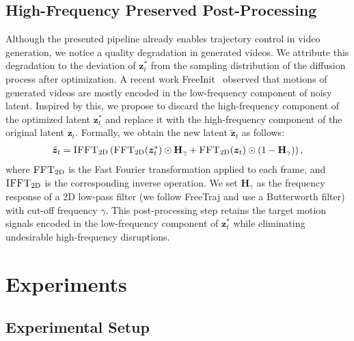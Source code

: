 \documentclass{article} \usepackage{iclr2025_conference,times}
\begin{document}
\vspace{-2.0mm}
\subsection{High-Frequency Preserved Post-Processing}
\label{sec:fft}

Although the presented pipeline already enables trajectory control in video generation, we notice a quality degradation in generated videos.
We attribute this degradation to the deviation of $\bm{z}_t^{*}$ from the sampling distribution of the diffusion process after optimization. 
A recent work FreeInit~\citep{wu2023freeinit} observed that motions of generated videos are mostly encoded in the low-frequency component of noisy latent.
Inspired by this, we propose to discard the high-frequency component of the optimized latent $\bm{z}_t^*$ and replace it with the high-frequency component of the original latent $\bm{z}_t$. 
Formally, we obtain the new latent $\tilde{\bm{z}}_t$ as follows:
\begin{equation}
\begin{aligned}
    \tilde{\bm{z}}_t = \textsc{IFFT}_{\mathrm{2D}}\left(\textsc{FFT}_{\mathrm{2D}}(\bm{z}_t^*) \odot \mathbf{H}_\gamma + \textsc{FFT}_{\mathrm{2D}}(\bm{z}_t) \odot (1 - \mathbf{H}_\gamma)\right),
\end{aligned}
\end{equation}
where $\textsc{FFT}_{\mathrm{2D}}$ is the Fast Fourier transformation applied to each frame, and $\textsc{IFFT}_{\mathrm{2D}}$ is the corresponding inverse operation.
We set $\mathbf{H}_\gamma$ as the frequency response of a 2D low-pass filter (we follow FreeTraj and use a Butterworth filter) with cut-off frequency $\gamma$.
This post-processing step retains the target motion signals encoded in the low-frequency component of $\bm{z}^*_t$ while eliminating undesirable high-frequency disruptions.  \vspace{-3.0mm}
\section{Experiments}
\label{sec:experiments}

\subsection{Experimental Setup}
\label{sec:exp_setup}
\end{document}
